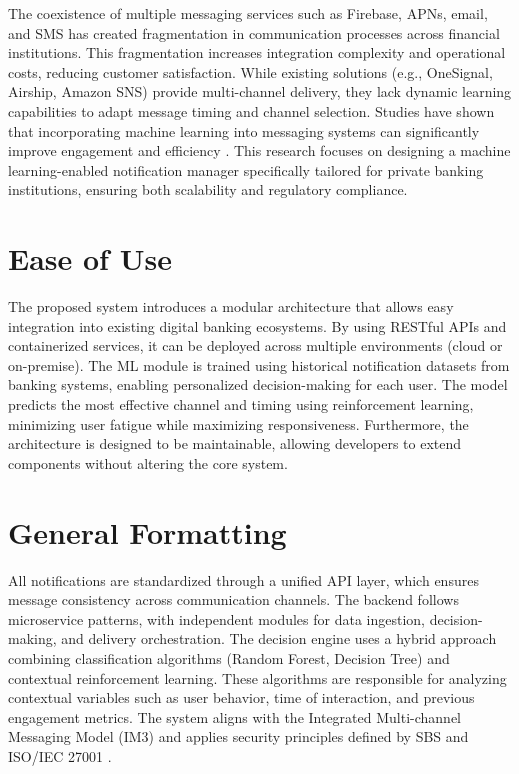 \documentclass[conference]{IEEEtran}
\begin{document}
The coexistence of multiple messaging services such as Firebase, APNs, email, and SMS has created fragmentation in communication processes across financial institutions. This fragmentation increases integration complexity and operational costs, reducing customer satisfaction. While existing solutions (e.g., OneSignal, Airship, Amazon SNS) provide multi-channel delivery, they lack dynamic learning capabilities to adapt message timing and channel selection. Studies have shown that incorporating machine learning into messaging systems can significantly improve engagement and efficiency \cite{rahimi2021}. This research focuses on designing a machine learning-enabled notification manager specifically tailored for private banking institutions, ensuring both scalability and regulatory compliance.

\section{Ease of Use}

The proposed system introduces a modular architecture that allows easy integration into existing digital banking ecosystems. By using RESTful APIs and containerized services, it can be deployed across multiple environments (cloud or on-premise). The ML module is trained using historical notification datasets from banking systems, enabling personalized decision-making for each user. The model predicts the most effective channel and timing using reinforcement learning, minimizing user fatigue while maximizing responsiveness. Furthermore, the architecture is designed to be maintainable, allowing developers to extend components without altering the core system.

\section{General Formatting}

All notifications are standardized through a unified API layer, which ensures message consistency across communication channels. The backend follows microservice patterns, with independent modules for data ingestion, decision-making, and delivery orchestration. The decision engine uses a hybrid approach combining classification algorithms (Random Forest, Decision Tree) and contextual reinforcement learning. These algorithms are responsible for analyzing contextual variables such as user behavior, time of interaction, and previous engagement metrics. The system aligns with the Integrated Multi-channel Messaging Model (IM3) \cite{liang2011} and applies security principles defined by SBS and ISO/IEC 27001 \cite{sbs2021}.
\end{document}
